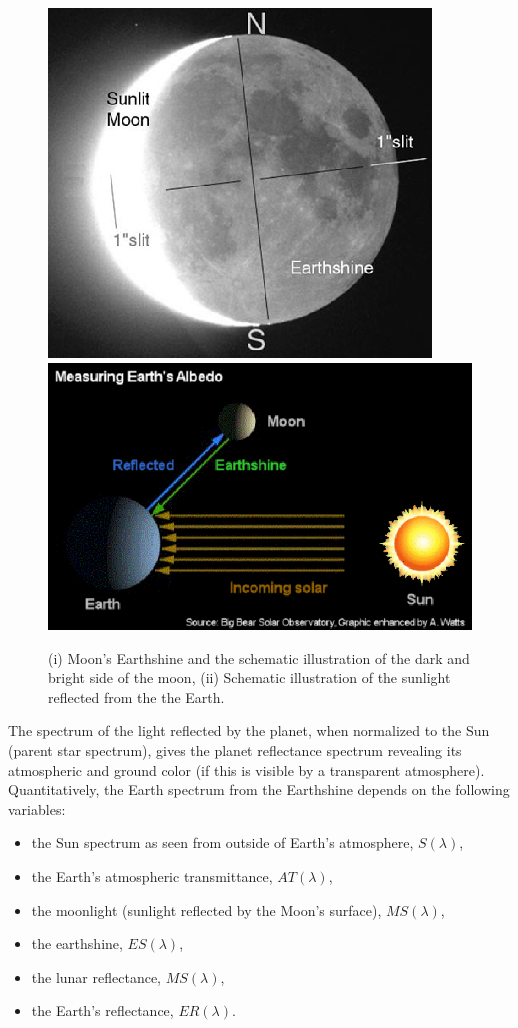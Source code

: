 \begin{figure}[h]
\centering
 \includegraphics[scale=0.45]{figs/4.png}
 \includegraphics[scale=0.45]{figs/3.png}
\caption{\footnotesize (i) Moon's Earthshine and the schematic illustration of
the dark and bright side of the moon, (ii) Schematic illustration of the
sunlight reflected from the the Earth.}
\label{2}
\end{figure}


The spectrum of the light reflected by the planet, when normalized to the Sun
(parent star spectrum), gives the planet reflectance spectrum revealing its
atmospheric and ground color (if this is visible by a transparent
atmosphere). Quantitatively, the Earth spectrum from the Earthshine depends on
the following
variables:
\begin{itemize}
 \item the Sun spectrum as seen from outside of Earth's atmosphere, $S(\lambda)$,
\item  the Earth's atmospheric transmittance, $AT(\lambda)$,
\item the moonlight (sunlight reflected by the Moon's surface), $MS(\lambda)$,
\item the earthshine, $ES(\lambda)$,
\item the lunar reflectance, $MS(\lambda)$,
\item the Earth's reflectance, $ER(\lambda)$.
\end{itemize}

